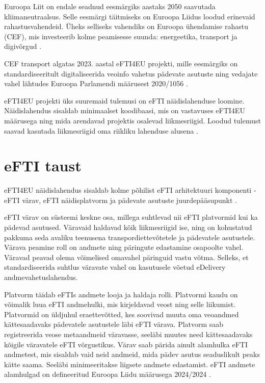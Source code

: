 Euroopa Liit on endale seadnud eesmärgiks aastaks 2050 saavutada kliimaneutraalsus.
Selle eesmärgi täitmiseks on Euroopa Liidus loodud erinevaid rahastusvahendeid.
Üheks selliseks vahendiks on Euroopa ühendamise rahastu (CEF), mis investeerib kolme 
peamisesse suunda: energeetika, transport ja digivõrgud \cite{cef}. 

CEF transport algatas 2023. aastal eFTI4EU projekti,
mille eesmärgiks on standardiseeritult digitaliseerida veoinfo vahetus pädevate 
asutuste ning vedajate vahel lähtudes Euroopa Parlamendi määrusest 2020/1056
\cite{efti4eu_project}\cite{eu_reg_2020_1056}.

eFTI4EU projekti üks suuremaid tulemusi on eFTI näidislahenduse loomine.
Näidislahendus sisaldab minimaalset koodibaasi, mis on vastavuses eFTI4EU määrusega ning
mida arendavad projektis osalevad liikmesriigid.
Loodud tulemust saavad kasutada liikmesriigid oma riikliku lahenduse alusena \cite{efti4eu_reference_impl}. 

\section{eFTI taust}

eFTI4EU näidislahendus sisaldab kolme põhilist eFTI arhitektuuri komponenti - eFTI värav, eFTI näidisplatvorm 
ja pädevate asutuste juurdepääsupunkt \cite{efti4eu_reference_impl}. 

eFTI värav on süsteemi keskne osa, millega suhtlevad nii eFTI platvormid kui ka pädevad asutused.
Väravaid haldavad kõik liikmesriigid ise, ning on kohustatud pakkuma seda avaliku 
teenusena transpordiettevõtetele ja pädevatele asutustele. Värava peamine roll on andmete ning
päringute edastamine osapoolte vahel. Väravad peavad olema võimelised omavahel päringuid vastu võtma.
Selleks, et standardiseerida suhtlus väravate vahel on kasutusele võetud eDelivery andmevahetuslahendus.

Platvorm täidab eFTIs andmete looja ja haldaja rolli. Platvormi kaudu on võimalik luua eFTI
andmehulki, mis kirjeldavad veost ning selle liikumist. Platvormid on üldjuhul eraettevõtted,
kes soovivad muuta oma veoandmed kättesaadavaks pädevatele asutustele läbi eFTI värava. 
Platvorm saab registreerida veose metaandmeid väravasse, seeläbi muutes need kättesaadavaks kõigile väravatele eFTI võrgustikus. 
Värav saab pärida ainult alamhulka eFTI andmetest, mis sisaldab vaid neid andmeid, mida pädev asutus
seaduslikult peaks kätte saama. Seeläbi minimeeritakse liigsete andmete edastamist.
eFTI andmete alamhulgad on defineeritud Euroopa Liidu määrusega 2024/2024 \cite{eu_reg_2024_2024}.


